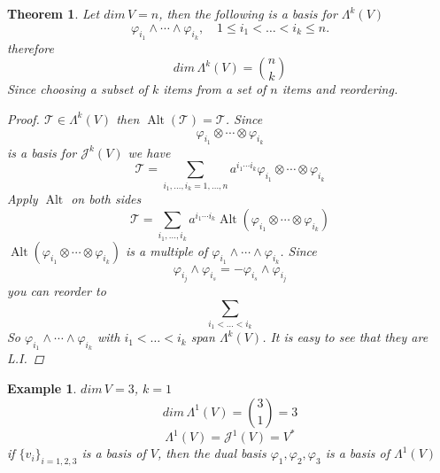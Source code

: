 \documentclass[11pt]{article}
\def\maj{\mathcal{J}}
\def\mat{\mathcal{T}}
\DeclareMathOperator{\alt}{Alt}
\newtheorem{theorem}{Theorem}[section]
\newtheorem{example}{Example}[section]
\begin{document}
\begin{theorem}
Let $dim\, V = n$, then the following is a basis for $\Lambda^k(V)$
\[\varphi_{i_1}\wedge\cdots\wedge\varphi_{i_k}, \quad 1 \leq i_1 < \dots < i_k \leq n. \]
therefore
\[dim\, \Lambda^k(V) = {n \choose k}\] Since choosing a subset of $k$ items from a set of $n$ items and reordering.
\begin{proof}
$\mat \in \Lambda^k(V)$ then $\alt(\mat) = \mat$. Since \[\varphi_{i_1} \otimes \cdots \otimes \varphi_{i_k}\] is a basis for $\maj^k(V)$ we have
\[\mat = \sum\limits_{i_1, \dots , i _k = 1, \dots , n}a^{i_1\cdots i_k}\varphi_{i_1} \otimes \cdots \otimes \varphi_{i_k}\]
Apply $\alt$ on both sides
\[ \mat = \sum\limits_{i_1, \dots , i _k}a^{i_1\cdots i_k}\alt(\varphi_{i_1} \otimes \cdots \otimes \varphi_{i_k})\]
$\alt(\varphi_{i_1} \otimes \cdots \otimes \varphi_{i_k})$ is a multiple of $\varphi_{i_1}\wedge\cdots\wedge\varphi_{i_k}$. Since 
\[\varphi_{i_j}\wedge\varphi_{i_s} = - \varphi_{i_s}\wedge\varphi_{i_j}\]
you can reorder to 
\[\sum\limits_{i_1 < \dots < i_k}\]
So $\varphi_{i_1}\wedge\cdots\wedge\varphi_{i_k}$ with $i_1 <\dots<i_k$ span $\Lambda^k(V)$. It is easy to see that they are L.I.
\end{proof}
\end{theorem}
\begin{example}
$dim\,V = 3$, $k=1$
\[dim\,\Lambda^1(V) = {3 \choose 1} = 3\]
\[\Lambda^1(V) = \maj^1(V) = V^{*}\]
if $\{v_i\}_{i=1,2,3}$ is a basis of $V$, then the dual basis $\varphi_1, \varphi_2, \varphi_3$ is a basis of $\Lambda^1(V)$
\end{example}
\end{document}
